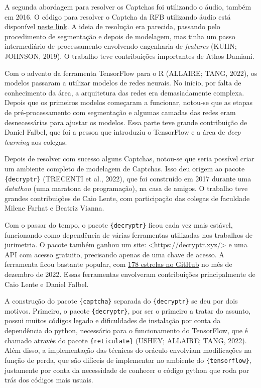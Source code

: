 \documentclass[12pt,twoside,brazilian]{book}
\begin{document}
A segunda abordagem para resolver os Captchas foi utilizando o áudio,
também em 2016. O código para resolver o Captcha da RFB utilizando áudio
está disponível
\href{https://github.com/decryptr/captchaReceitaAudio}{neste link}. A
ideia de resolução era parecida, passando pelo procedimento de
segmentação e depois de modelagem, mas tinha um passo intermediário de
processamento envolvendo engenharia de \emph{features} (KUHN; JOHNSON,
2019). O trabalho teve contribuições importantes de Athos Damiani.

Com o advento da ferramenta TensorFlow para o R (ALLAIRE; TANG, 2022),
os modelos passaram a utilizar modelos de redes neurais. No início, por
falta de conhecimento da área, a arquitetura das redes era
demasiadamente complexa. Depois que os primeiros modelos começaram a
funcionar, notou-se que as etapas de pré-processamento com segmentação e
algumas camadas das redes eram desnecessárias para ajustar os modelos.
Essa parte teve grande contribuição de Daniel Falbel, que foi a pessoa
que introduziu o TensorFlow e a área de \emph{deep learning} aos
colegas.

Depois de resolver com sucesso alguns Captchas, notou-se que seria
possível criar um ambiente completo de modelagem de Captchas. Isso deu
origem ao pacote \texttt{\{decryptr\}} (TRECENTI et al., 2022), que foi
construído em 2017 durante uma \emph{datathon} (uma maratona de
programação), na casa de amigos. O trabalho teve grandes contribuições
de Caio Lente, com participação das colegas de faculdade Milene Farhat e
Beatriz Vianna.

Com o passar do tempo, o pacote \texttt{\{decryptr\}} ficou cada vez
mais estável, funcionando como dependência de várias ferramentas
utilizadas nos trabalhos de jurimetria. O pacote também ganhou um site:
\textless https://decryptr.xyz/\textgreater{} e uma API com acesso
gratuito, precisando apenas de uma chave de acesso. A ferramenta ficou
bastante popular, com \href{https://github.com/decryptr/decryptr}{178
estrelas no GitHub} no mês de dezembro de 2022. Essas ferramentas
envolveram contribuições principalmente de Caio Lente e Daniel Falbel.

A construção do pacote \texttt{\{captcha\}} separada do
\texttt{\{decryptr\}} se deu por dois motivos. Primeiro, o pacote
\texttt{\{decryptr\}}, por ser o primeiro a tratar do assunto, possui
muitos códigos legado e dificuldades de instalação por conta da
dependência do python, necessário para o funcionamento do TensorFlow,
que é chamado através do pacote \texttt{\{reticulate\}} (USHEY; ALLAIRE;
TANG, 2022). Além disso, a implementação das técnicas do oráculo
envolviam modificações na função de perda, que são difíceis de
implementar no ambiente do \texttt{\{tensorflow\}}, justamente por conta
da necessidade de conhecer o código python que roda por trás dos códigos
mais usuais.
\end{document}
